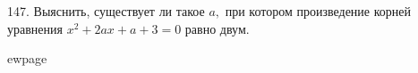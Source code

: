 147. Выяснить, существует ли такое $a,$ при котором произведение корней уравнения $x^2+2ax+a+3=0$ равно двум.

ewpage
